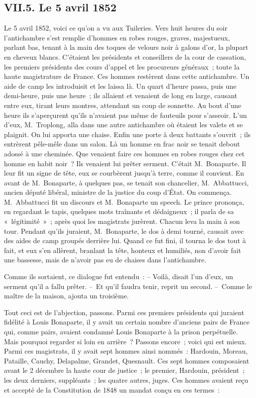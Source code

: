 \documentclass[french,twoside]{book} %
\begin{document}
\subsection[{VII.5. Le 5 avril 1852}]{VII.5. Le 5 avril 1852}
\noindent Le 5 avril 1852, voici ce qu’on a vu aux Tuileries. Vers huit heures du soir l’antichambre s’est remplie d’hommes en robes rouges, graves, majestueux, parlant bas, tenant à la main des toques de velours noir à galons d’or, la plupart en cheveux blancs. C’étaient les présidents et conseillers de la cour de cassation, les premiers présidents des cours d’appel et les procureurs généraux ; toute la haute magistrature de France. Ces hommes restèrent dans cette antichambre. Un aide de camp les introduisit et les laissa là. Un quart d’heure passa, puis une demi-heure, puis une heure ; ils allaient et venaient de long en large, causant entre eux, tirant leurs montres, attendant un coup de sonnette. Au bout d’une heure ils s’aperçurent qu’ils n’avaient pas même de fauteuils pour s’asseoir. L’un d’eux, M. Troplong, alla dans une autre antichambre où étaient les valets et se plaignit. On lui apporta une chaise. Enfin une porte à deux battants s’ouvrit ; ils entrèrent pêle-mêle dans un salon. Là un homme en frac noir se tenait debout adossé à une cheminée. Que venaient faire ces hommes en robes rouges chez cet homme en habit noir ? Ils venaient lui prêter serment. C’était M. Bonaparte. Il leur fit un signe de tête, eux se courbèrent jusqu’à terre, comme il convient. En avant de M. Bonaparte, à quelques pas, se tenait son chancelier, M. Abbattucci, ancien député libéral, ministre de la justice du coup d’État. On commença. M. Abbattucci fit un discours et M. Bonaparte un speech. Le prince prononça, en regardant le tapis, quelques mots traînants et dédaigneux ; il parla de sa « légitimité » ; après quoi les magistrats jurèrent. Chacun leva la main à son tour. Pendant qu’ils juraient, M. Bonaparte, le dos à demi tourné, causait avec des aides de camp groupés derrière lui. Quand ce fut fini, il tourna le dos tout à fait, et eux s’en allèrent, branlant la tête, honteux et humiliés, non d’avoir fait une bassesse, mais de n’avoir pas eu de chaises dans l’antichambre.\par
Comme ils sortaient, ce dialogue fut entendu : – Voilà, disait l’un d’eux, un serment qu’il a fallu prêter. – Et qu’il faudra tenir, reprit un second. – Comme le maître de la maison, ajouta un troisième.\par
Tout ceci est de l’abjection, passons. Parmi ces premiers présidents qui juraient fidélité à Louis Bonaparte, il y avait un certain nombre d’anciens pairs de France qui, comme pairs, avaient condamné Louis Bonaparte à la prison perpétuelle. Mais pourquoi regarder si loin en arrière ? Passons encore ; voici qui est mieux. Parmi ces magistrats, il y avait sept hommes ainsi nommés : Hardouin, Moreau, Pataille, Cauchy, Delapalme, Grandet, Quesnault. Ces sept hommes composaient avant le 2 décembre la haute cour de justice ; le premier, Hardouin, président ; les deux derniers, suppléants ; les quatre autres, juges. Ces hommes avaient reçu et accepté de la Constitution de 1848 un mandat conçu en ces termes :\par
\end{document}
